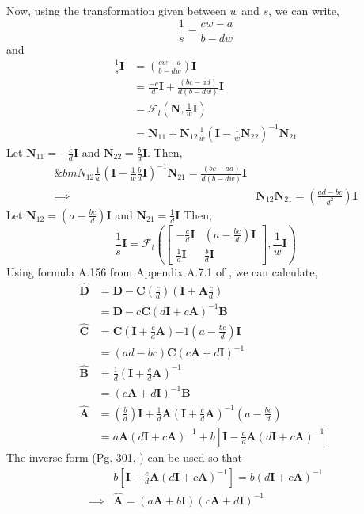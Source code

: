 Now, using the transformation given between $w$ and $s$, we can write, $$\frac{1}{s} = \frac{cw-a}{b-dw}$$
and
\begin{align*}
    \frac{1}{s}\bm{I} &= \left(\frac{cw-a}{b-dw}\right)\bm{I}\\
    &= \frac{-c}{d}\bm{I} + \frac{(bc-ad)}{d(b-dw)}\bm{I}\\
    &= \mathcal{F}_l\left(\bm{N},\frac{1}{w}\bm{I}\right)\\
    &= \bm{N}_{11} + \bm{N}_{12}\frac{1}{w}\left(\bm{I} - \frac{1}{w}\bm{N}_{22}\right)^{-1}\bm{N}_{21}
\end{align*}
Let $\mathbf{N}_{11} = -\frac{c}{d}\mathbf{I}$ and $\mathbf{N}_{22} = \frac{b}{d}\mathbf{I}$. Then,
\begin{align*}
    \&bm{N}_{12}\frac{1}{w}\left(\bm{I} - \frac{1}{w}\frac{b}{d}\bm{I}\right)^{-1}\bm{N}_{21} =
    \frac{(bc-ad)}{d(b-dw)}\bm{I}\\
    \implies &\bm{N}_{12}\bm{N}_{21} = \left(\frac{ad-bc}{d^2}\right)\bm{I}
\end{align*}
Let $\mathbf{N}_{12} = \left(a-\frac{bc}{d}\right)\mathbf{I}$ and $\mathbf{N}_{21} = \frac{1}{d}\mathbf{I}$
Then, $$\frac{1}{s}\bm{I} = \mathcal{F}_l\left(\begin{bmatrix}
    -\frac{c}{d}\bm{I} & \left(a-\frac{bc}{d}\right)\bm{I}\\
     \frac{1}{d}\bm{I} & \frac{b}{d}\bm{I}
\end{bmatrix},\frac{1}{w}\bm{I}\right)$$
Using formula A.156 from Appendix A.7.1 of \cite{Sko05}, we can calculate,
\begin{align*}
    \hat{\bm{D}} &= \bm{D} - \bm{C}\left(\frac{c}{d}\right)\left(\bm{I} + \bm{A}\frac{c}{d}\right)\\
    &= \bm{D} - c\bm{C}(d\bm{I} + c\bm{A})^{-1}\bm{B}\\
    \hat{\bm{C}} &= \bm{C}\left(\bm{I} + \frac{c}{d}\bm{A}\right){-1}\left(a-\frac{bc}{d}\right)\bm{I}\\
    &= (ad-bc)\bm{C}\left(c\bm{A} + d\bm{I}\right)^{-1}\\
    \hat{\bm{B}} &= \frac{1}{d}\left(\bm{I} + \frac{c}{d}\bm{A}\right)^{-1}\\
    &= \left(c\bm{A} + d\bm{I}\right)^{-1}\bm{B}\\
    \hat{\bm{A}} &=\left(\frac{b}{d}\right)\bm{I} + \frac{1}{d}\bm{A}\left(\bm{I} + \frac{c}{d}\bm{A}\right)^{-1}\left(a-\frac{bc}{d}\right)\\
    &= a\bm{A}(d\bm{I} + c\bm{A})^{-1} + b\left[\bm{I} - \frac{c}{d}\bm{A}(d\bm{I} + c\bm{A})^{-1}\right]
\end{align*}
The inverse form (Pg. 301, \cite{Sko05}) can be used so that 
\begin{align*}
    &b\left[\bm{I} - \frac{c}{d}\bm{A}(d\bm{I} + c\bm{A})^{-1}\right] = b(d\bm{I} + c\bm{A})^{-1}\\
    \implies &\hat{\bm{A}} = (a\bm{A} + b\bm{I})\left(c\bm{A} + d\bm{I}\right)^{-1}
\end{align*}

